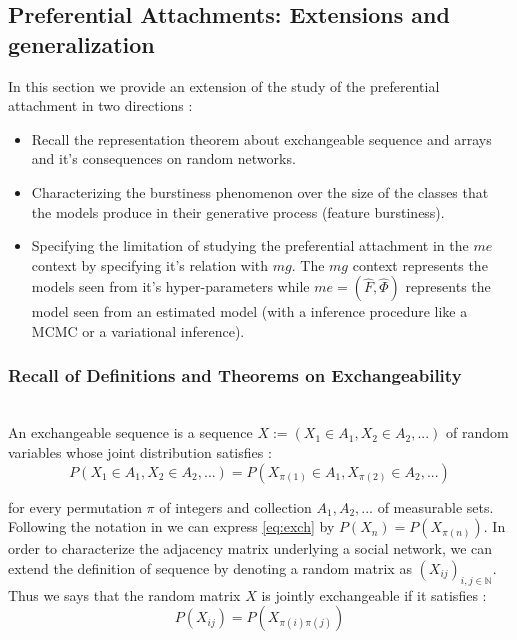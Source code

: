 
\subsection{Preferential Attachments: Extensions and generalization}

In this section we provide an extension of the study of the preferential attachment in two directions :
\begin{itemize}
    \item Recall the representation theorem \cite{orbanz2015bayesian} about exchangeable sequence and arrays and it's consequences on random networks.%
    \item Characterizing the burstiness phenomenon over the size of the classes that the models produce in their generative process (feature burstiness). 
    \item Specifying the limitation of studying the preferential attachment in the $me$ context by specifying it's relation with $mg$. The $mg$ context represents the models seen from it's hyper-parameters while $me = (\hat F, \hat \Phi)$ represents the model seen from an estimated model (with a inference procedure like a MCMC or a variational inference).
\end{itemize}

\subsubsection{Recall of Definitions and Theorems on Exchangeability}~\\

An exchangeable sequence is a sequence $X := (X_1 \in A_1, X_2 \in A_2,...)$ of random variables whose joint distribution satisfies :
\begin{equation}\label{eq:exch}
P(X_1 \in A_1, X_2 \in A_2,...) = P(X_{\pi(1)} \in A_1, X_{\pi(2)} \in A_2,...)
\end{equation}

for every permutation $\pi$  of integers and collection $A_1, A_2,...$ of measurable sets. Following the notation in \cite{orbanz2015bayesian} we can express \eqref{eq:exch} by $P(X_n) = P(X_{\pi(n)})$. In order to characterize the adjacency matrix underlying a social network, we can extend the definition of sequence by denoting a random matrix as $(X_{ij})_{i,j \in \mathbb{N}}$. Thus we says that the random matrix $X$ is jointly exchangeable if it satisfies :
	\begin{equation}
	P(X_{ij}) = P(X_{\pi(i)\pi(j)})
	\end{equation}
	
